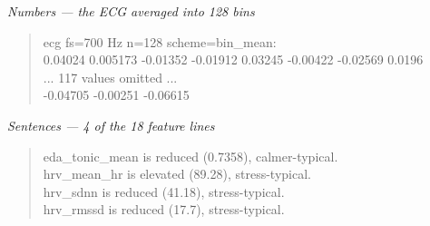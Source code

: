 \noindent\textit{Numbers --- the ECG averaged into 128 bins}
\begin{quote}\ttfamily\footnotesize
ecg fs=700 Hz n=128 scheme=bin\_mean:\\0.04024 0.005173 -0.01352 -0.01912 0.03245 -0.00422 -0.02569 0.0196\\... 117 values omitted ...\\-0.04705 -0.00251 -0.06615
\end{quote}
\noindent\textit{Sentences --- 4 of the 18 feature lines}
\begin{quote}\ttfamily\footnotesize
eda\_tonic\_mean is reduced (0.7358), calmer-typical.\\hrv\_mean\_hr is elevated (89.28), stress-typical.\\hrv\_sdnn is reduced (41.18), stress-typical.\\hrv\_rmssd is reduced (17.7), stress-typical.
\end{quote}
